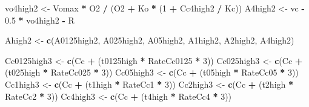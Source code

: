 \documentclass[
]{krantz}
\makeatletter
\newenvironment{Shaded}{\begin{snugshade}}{\end{snugshade}}
\newcommand{\DecValTok}[1]{\textcolor[rgb]{0.00,0.00,0.81}{#1}}
\newcommand{\FloatTok}[1]{\textcolor[rgb]{0.00,0.00,0.81}{#1}}
\newcommand{\KeywordTok}[1]{\textcolor[rgb]{0.13,0.29,0.53}{\textbf{#1}}}
\newcommand{\NormalTok}[1]{#1}
\newcommand{\OperatorTok}[1]{\textcolor[rgb]{0.81,0.36,0.00}{\textbf{#1}}}
\newcommand{\StringTok}[1]{\textcolor[rgb]{0.31,0.60,0.02}{#1}}
\newenvironment{kframe}{%
\medskip{}
\setlength{\fboxsep}{.8em}
 \def\at@end@of@kframe{}%
 \ifinner\ifhmode%
  \def\at@end@of@kframe{\end{minipage}}%
  \begin{minipage}{\columnwidth}%
 \fi\fi%
 \def\FrameCommand##1{\hskip\@totalleftmargin \hskip-\fboxsep
 \colorbox{shadecolor}{##1}\hskip-\fboxsep
     \hskip-\linewidth \hskip-\@totalleftmargin \hskip\columnwidth}%
 \MakeFramed {\advance\hsize-\width
   \@totalleftmargin\z@ \linewidth\hsize
   \@setminipage}}%
 {\par\unskip\endMakeFramed%
 \at@end@of@kframe}
\renewenvironment{Shaded}{\begin{kframe}}{\end{kframe}}
\makeatother
\begin{document}
\begin{Shaded}
\begin{Highlighting}[]
\NormalTok{vo4high2 \textless{}{-}}\StringTok{ }\NormalTok{Vomax }\OperatorTok{*}\StringTok{ }\NormalTok{O2 }\OperatorTok{/}\StringTok{ }\NormalTok{(O2 }\OperatorTok{+}\StringTok{ }\NormalTok{Ko }\OperatorTok{*}\StringTok{ }\NormalTok{(}\DecValTok{1} \OperatorTok{+}\StringTok{ }\NormalTok{Cc4high2 }\OperatorTok{/}\StringTok{ }\NormalTok{Kc)) }
\NormalTok{A4high2 \textless{}{-}}\StringTok{ }\NormalTok{vc }\OperatorTok{{-}}\StringTok{ }\FloatTok{0.5} \OperatorTok{*}\StringTok{ }\NormalTok{vo4high2 }\OperatorTok{{-}}\StringTok{ }\NormalTok{R }

\NormalTok{Ahigh2 \textless{}{-}}
\StringTok{  }\KeywordTok{c}\NormalTok{(A0125high2, A025high2, A05high2, A1high2, A2high2, A4high2)}

\NormalTok{Cc0125high3 \textless{}{-}}\StringTok{ }\KeywordTok{c}\NormalTok{(Cc }\OperatorTok{+}\StringTok{ }\NormalTok{(t0125high }\OperatorTok{*}\StringTok{ }\NormalTok{RateCc0125 }\OperatorTok{*}\StringTok{ }\DecValTok{3}\NormalTok{))}
\NormalTok{Cc025high3 \textless{}{-}}\StringTok{ }\KeywordTok{c}\NormalTok{(Cc }\OperatorTok{+}\StringTok{ }\NormalTok{(t025high }\OperatorTok{*}\StringTok{ }\NormalTok{RateCc025 }\OperatorTok{*}\StringTok{ }\DecValTok{3}\NormalTok{))}
\NormalTok{Cc05high3 \textless{}{-}}\StringTok{ }\KeywordTok{c}\NormalTok{(Cc }\OperatorTok{+}\StringTok{ }\NormalTok{(t05high }\OperatorTok{*}\StringTok{ }\NormalTok{RateCc05 }\OperatorTok{*}\StringTok{ }\DecValTok{3}\NormalTok{))}
\NormalTok{Cc1high3 \textless{}{-}}\StringTok{ }\KeywordTok{c}\NormalTok{(Cc }\OperatorTok{+}\StringTok{ }\NormalTok{(t1high }\OperatorTok{*}\StringTok{ }\NormalTok{RateCc1 }\OperatorTok{*}\StringTok{ }\DecValTok{3}\NormalTok{))}
\NormalTok{Cc2high3 \textless{}{-}}\StringTok{ }\KeywordTok{c}\NormalTok{(Cc }\OperatorTok{+}\StringTok{ }\NormalTok{(t2high }\OperatorTok{*}\StringTok{ }\NormalTok{RateCc2 }\OperatorTok{*}\StringTok{ }\DecValTok{3}\NormalTok{))}
\NormalTok{Cc4high3 \textless{}{-}}\StringTok{ }\KeywordTok{c}\NormalTok{(Cc }\OperatorTok{+}\StringTok{ }\NormalTok{(t4high }\OperatorTok{*}\StringTok{ }\NormalTok{RateCc4 }\OperatorTok{*}\StringTok{ }\DecValTok{3}\NormalTok{))}


\end{Highlighting}
\end{Shaded}
\end{document}
